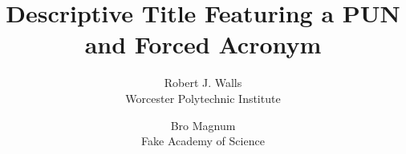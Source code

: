 \newcommand{\thetitle}{Descriptive Title Featuring a PUN \\ and Forced Acronym}
\newcommand{\pdftitle}{Descriptive Title Featuring a PUN and Forced Acronym}
\newcommand{\pdfauthors}{Robert J. Walls, Bro Magnum} 

\newcount\draft{} 

\newcommand{\sysname}{\textsc{System\-Name\-That\-Pun}\xspace}





\title{\Large \bf \thetitle}

\author{
{\rm Robert  J. Walls}\\
Worcester Polytechnic Institute
\and
{\rm Bro Magnum}\\
Fake Academy of Science
}  


\maketitle







